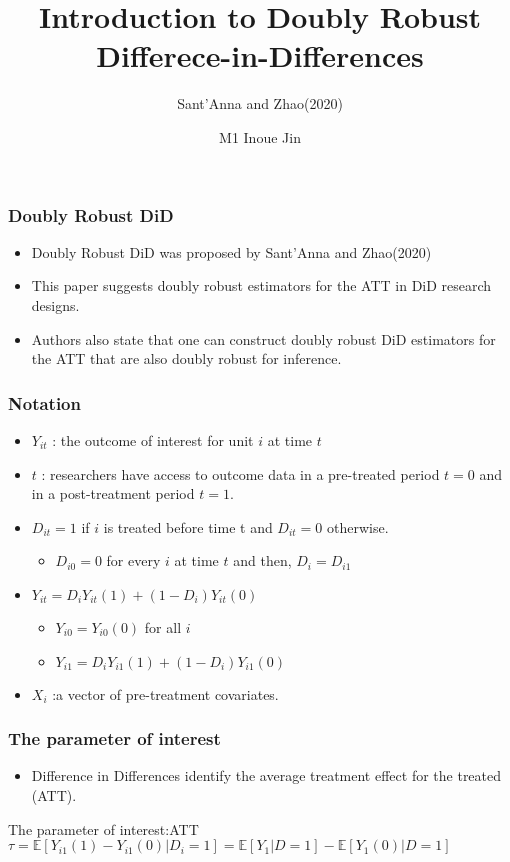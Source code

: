 \documentclass{beamer}
\title{Introduction to Doubly Robust Differece-in-Differences}
\subtitle{Sant'Anna and Zhao(2020)}
\author{M1 Inoue Jin}
\institute{Hitotsubashi University}
\begin{document}

\begin{frame}
    \titlepage
\end{frame}

\begin{frame}\frametitle{Doubly Robust DiD}
    \begin{itemize}
        \item Doubly Robust DiD was proposed by Sant'Anna and Zhao(2020)
        \item This paper suggests doubly robust estimators for the ATT in DiD research designs.
        \item Authors also state that one can construct doubly robust DiD estimators for the ATT that are also doubly robust for inference.
    \end{itemize}
\end{frame}

\begin{frame}\frametitle{Notation}
    \begin{itemize}
        \item $Y_{it}$ : the outcome of interest for unit $i$ at time $t$
        \item $t$ : researchers have access to outcome data in a pre-treated period $t = 0$ and in a post-treatment period $t = 1$.
        \item $D_{it} = 1$ if $i$ is treated before time t and $D_{it} = 0$ otherwise.
        \begin{itemize}
            \item $D_{i0} = 0$ for every $i$ at time $t$ and then, $D_{i} = D_{i1}$
        \end{itemize}
        \item $Y_{it} = D_{i}Y_{it}(1) + (1 - D_{i})Y_{it}(0)$
        \begin{itemize}
            \item $Y_{i0} = Y_{i0}(0)$ for all $i$ 
            \item $Y_{i1} = D_{i}Y_{i1}(1) + (1 - D_{i})Y_{i1}(0)$ 
        \end{itemize}
        \item $X_{i}$ :a vector of pre-treatment covariates.
    \end{itemize}
\end{frame}

\begin{frame}\frametitle{The parameter of interest}
    \begin{itemize}
        \item Difference in Differences identify the average treatment effect for the treated (ATT). 
    \end{itemize}
    \begin{block}{The parameter of interest:ATT}
        $\tau = \mathbb{E}[Y_{i1}(1) - Y_{i1}(0)| D_{i} = 1] = \mathbb{E}[Y_{1} |D = 1] - \mathbb{E}[Y_{1}(0) | D = 1]$
    \end{block}
\end{frame}
\end{document}
